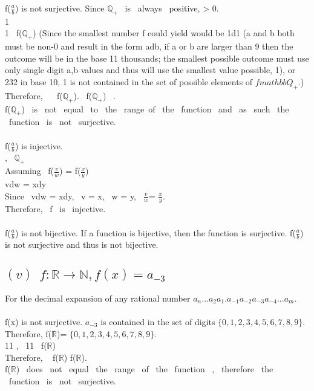\documentclass[12pt]{article}
\theoremstyle{definition}
\numberwithin{equation}{subsection}
\begin{document}
f($\frac{a}{b}$) is not surjective. Since $\mathbb{Q}_{+}$ \ is \ always \ positive,  > 0.
\\ 1 \in {}
\\ 1 \notin \ f($\mathbb{Q}_{+}$)
(Since the smallest number f could yield would be 1d1 (a and b both must be non-0 and result in the form adb, if a or b are larger than 9 then the outcome will be in the base 11 thousands; the smallest possible outcome must use only single digit a,b values and thus will use the smallest value possible, 1), or 232 in base 10, 1 is not contained in the set of possible elements of $f{mathbb{Q}_{+}}$.)
\\ Therefore, \  \nsubseteq \ f($\mathbb{Q}_{+}$). \ f($\mathbb{Q}_{+}$) \neq \ .
\\ f($\mathbb{Q}_{+}$) \ is \ not \ equal \ to \ the \ range\ of \ the \ function \ and \ as \ such \ the \ function \ is \ not \ surjective. \\ \\

f($\frac{a}{b}$) is injective.
\\ \exists {},  \ \in $\mathbb{Q}_{+}$
\\ Assuming \ f($\frac{v}{w}$) = f($\frac{x}{y}$)
\\ vdw = xdy
\\ Since \ vdw = xdy, \ v = x, \ w = y, \ $\frac{v}{w}$= $\frac{x}{y}$.
\\ Therefore, \ f \ is \ injective. \\ \\

f($\frac{a}{b}$) is not bijective. If a function is bijective, then the function is surjective. f($\frac{a}{b}$) is not surjective and thus is not bijective.

\subsection*{$(v) \enspace f: \mathbb{R} \to \mathbb{N} , f(x) = a_{-3} $}
For the decimal expansion of any rational number $a_{n}...a_{2}a_{1}.a_{-1}a_{-2}a_{-3}a_{-4}...a_{m}$. \\ \\
f(x) is not surjective. $a_{-3}$ is contained in the set of digits $\{0,1,2,3,4,5,6,7,8,9\}$. Therefore, f($\mathbb{R}$)= $\{0,1,2,3,4,5,6,7,8,9\}$.
\\ 11 \in {}, \ 11 \notin \ f($\mathbb{R}$)
\\ Therefore, \  \nsubseteq f($\mathbb{R}$) \implies {} \neq f($\mathbb{R}$).
\\ f($\mathbb{R}$) \ does \ not \ equal \ the \ range \ of \ the \ function \ , \ therefore \ the \ function \ is \ not \ surjective. \\ \\
\end{document}
